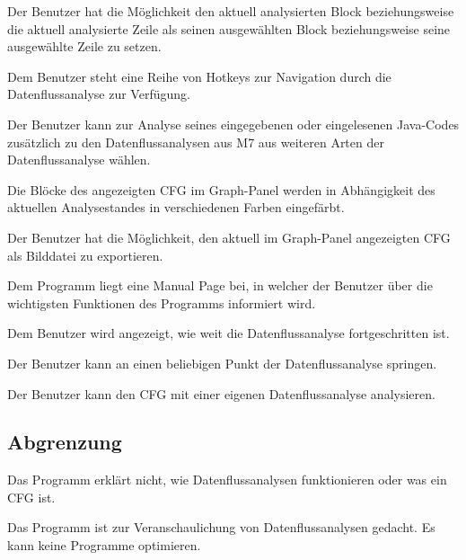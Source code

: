 Der Benutzer hat die Möglichkeit den aktuell analysierten Block beziehungsweise die aktuell analysierte Zeile als seinen ausgewählten Block beziehungsweise seine ausgewählte Zeile zu setzen.

Dem Benutzer steht eine Reihe von Hotkeys zur Navigation durch die
Datenflussanalyse zur Verfügung.

Der Benutzer kann zur Analyse seines eingegebenen oder eingelesenen Java-Codes
zusätzlich zu den Datenflussanalysen aus M7 aus weiteren Arten der Datenflussanalyse
wählen.

Die Blöcke des angezeigten CFG im Graph-Panel werden in
Abhängigkeit des aktuellen Analysestandes in verschiedenen Farben eingefärbt.

Der Benutzer hat die Möglichkeit, den aktuell im Graph-Panel angezeigten CFG als Bilddatei zu exportieren. 

Dem Programm liegt eine Manual Page bei, in welcher der Benutzer über die wichtigsten Funktionen des Programms informiert wird.

Dem Benutzer wird angezeigt, wie weit die Datenflussanalyse fortgeschritten ist.

Der Benutzer kann an einen beliebigen Punkt der Datenflussanalyse springen.

Der Benutzer kann den CFG mit einer eigenen Datenflussanalyse analysieren.

\newpage
\subsection{Abgrenzung}

Das Programm erklärt nicht, wie Datenflussanalysen funktionieren oder was ein CFG ist.

Das Programm ist zur Veranschaulichung von Datenflussanalysen gedacht. Es kann keine Programme optimieren.

